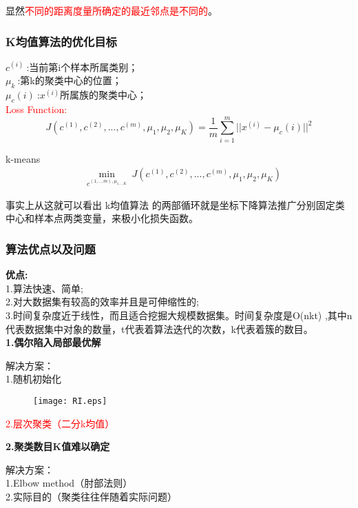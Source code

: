 显然\textcolor{red}{不同的距离度量所确定的最近邻点是不同的}。


\subsubsection{K均值算法的优化目标}
\noindent
$c^{(i)}~$:当前第i个样本所属类别；\\
$\mu_k~$:第k的聚类中心的位置；\\
$\mu_c(i)~$:$x^{(i)}$所属族的聚类中心；\\
\textcolor{red}{Loss Function:}\\
$$J(c^{(1)},c^{(2)},...,c^{(m)},\mu_1,\mu_2,\mu_K)=\frac{1}{m}\sum_{i=1}^{m}||x^{(i)}-\mu_c(i)||^2$$

k-means
\begin{align}
            &\min \limits_{c^{(1,..,m),\mu_{1,..,K}}}~J(c^{(1)},c^{(2)},...,c^{(m)},\mu_1,\mu_2,\mu_K)  \nonumber
\end{align}

事实上从这就可以看出 k均值算法 的两部循环就是坐标下降算法推广分别固定类中心和样本点两类变量，来极小化损失函数。

\subsubsection{算法优点以及问题}
\noindent \textbf{优点:}\\
\indent 1.算法快速、简单;\\
\indent 2.对大数据集有较高的效率并且是可伸缩性的;\\
\indent 3.时间复杂度近于线性，而且适合挖掘大规模数据集。时间复杂度是O(nkt) ,其中n代表数据集中对象的数量，t代表着算法迭代的次数，k代表着簇的数目。\\


\noindent\textbf{1.偶尔陷入局部最优解}

解决方案：\\
\indent 1.随机初始化
\begin{figure}[!ht]
  \centering
  \texttt{[image: RI.eps]}
\end{figure}

\textcolor{red}{2.层次聚类（二分k均值）}


\noindent\textbf{2.聚类数目K值难以确定}

解决方案：\\
\indent 1.Elbow method（肘部法则）  \\
\indent 2.实际目的（聚类往往伴随着实际问题）


